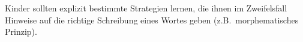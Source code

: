 Kinder sollten explizit bestimmte Strategien lernen, die ihnen im Zweifelsfall Hinweise auf die richtige Schreibung eines Wortes geben (z.B.\ morphematisches Prinzip).